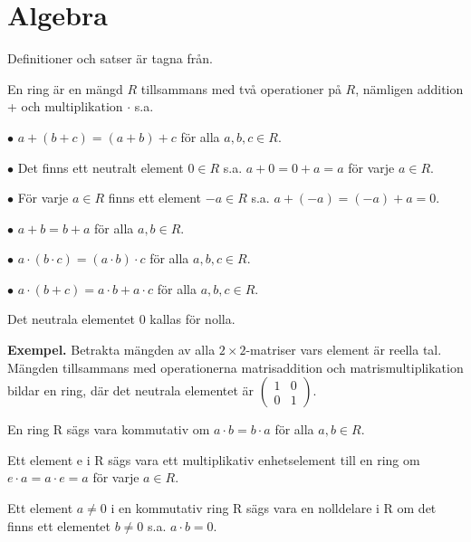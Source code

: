 \section{Algebra}
\label{sec:algebra}
Definitioner och satser är tagna från\cite{durbin2008modern}.

\begin{definition}
En ring är en mängd $R$ tillsammans med två operationer på $R$, nämligen
addition + och multiplikation $\cdot$ s.a.

$\bullet$ $a+(b+c) = (a+b)+c$ för alla $a,b,c \in R$.

$\bullet$ Det finns ett neutralt element $0 \in R$ s.a. $a+0=0+a=a$ för varje $a \in R$.

$\bullet$ För varje $a \in R$ finns ett element $-a \in R$ s.a. $a + (-a) = (-a) + a = 0$.

$\bullet$ $a + b = b + a$ för alla $a,b \in R$.

$\bullet$ $a \cdot (b \cdot c)=(a \cdot b) \cdot c$ för alla $a,b,c \in R$.

$\bullet$ $a \cdot (b + c) = a \cdot b + a \cdot c$ för alla $a,b,c \in R$.

\noindent
Det neutrala elementet $0$ kallas för nolla.

\end{definition}

\noindent\textbf{Exempel.} Betrakta mängden av alla $2 \times 2$-matriser vars
element är reella tal. Mängden tillsammans med operationerna matrisaddition och
matrismultiplikation bildar en ring, där det neutrala elementet är $
\begin{pmatrix}
  1 & 0 \\
  0 & 1
\end{pmatrix}.
$

\begin{definition}
En ring R sägs vara kommutativ om $a \cdot b = b \cdot a$ för alla $a,b \in R$.
\end{definition}

\begin{definition}
Ett element e i R sägs vara ett multiplikativ enhetselement till en ring om
$e \cdot a = a \cdot e = a$ för varje $a \in R$.
\end{definition}

\begin{definition}
Ett element $a \neq 0$ i en kommutativ ring R sägs vara en nolldelare i R om
det finns ett elementet $b \neq 0$ s.a. $a \cdot b = 0$.
\end{definition}

